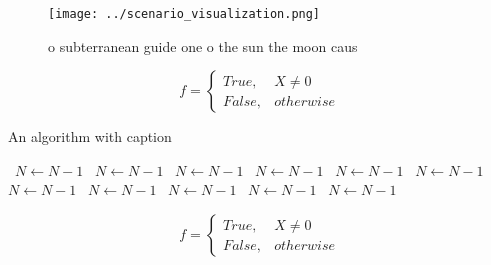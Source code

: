 \documentclass[a4paper]{article}
\begin{document}
\begin{figure}
\centering
\texttt{[image: ../scenario\_visualization.png]}
\caption{ o subterranean guide one o the sun the moon caus
}
\end{figure}
 
\begin{equation}   f =
\begin{cases} True, & X \neq 0\\
False, & otherwise
\end{cases}
\end{equation}

\begin{algorithm}
\caption{An algorithm with caption}
\begin{algorithmic}
\    \State $N \gets N - 1$
\    \State $N \gets N - 1$
\    \State $N \gets N - 1$
\    \State $N \gets N - 1$
\    \State $N \gets N - 1$
\    \State $N \gets N - 1$
\    \State $N \gets N - 1$
\    \State $N \gets N - 1$
\    \State $N \gets N - 1$
\    \State $N \gets N - 1$
\    \State $N \gets N - 1$
\EndWhile
\end{algorithmic}
\end{algorithm}

\begin{equation}   f =
\begin{cases} True, & X \neq 0\\
False, & otherwise
\end{cases}
\end{equation}
\end{document}
